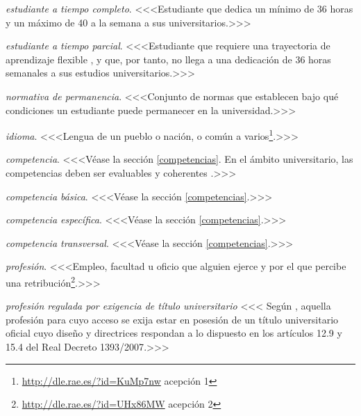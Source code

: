     \item \emph{estudiante a tiempo completo}. <<<Estudiante que dedica un mínimo
        de 36 horas y un máximo de 40 a la semana a sus
        universitarios\cite[artículo 4, apartado 4]{rdECTS}.>>>

    \item \emph{estudiante a tiempo parcial}. <<<Estudiante que requiere una
        trayectoria de aprendizaje flexible \cite[artículo 7, apartado 
        2]{estatutoEstudiante}, y que, por tanto, no llega a una dedicación de
        36 horas semanales a sus estudios universitarios.>>>

    \item \emph{normativa de permanencia}. <<<Conjunto de normas que establecen
        bajo qué condiciones un estudiante puede permanecer en la universidad.>>>

    \item \label{idioma} \emph{idioma}. <<<Lengua de un pueblo o nación, o común a
        varios\footnote{\url{http://dle.rae.es/?id=KuMp7nw} acepción 1}.>>>

    \item \emph{competencia}. <<<Véase la sección \ref{competencias}.
        En el ámbito universitario, las competencias deben ser
        evaluables y coherentes \cite[página 19]{guiaAneca}.>>>

    \item \emph{competencia básica}. <<<Véase la sección \ref{competencias}.>>>

    \item \emph{competencia específica}. <<<Véase la sección \ref{competencias}.>>>

    \item \emph{competencia transversal}. <<<Véase la sección \ref{competencias}.>>>

    \item \emph{profesión}. <<<Empleo, facultad u oficio que alguien ejerce y por
        el que percibe una
        retribución\footnote{\url{http://dle.rae.es/?id=UHx86MW} acepción 2}.>>>

    \item \emph{profesión regulada por exigencia de título universitario} <<< 
        Según \cite[artículo 4, apartado c]{rdECTS}, aquella profesión para cuyo
        acceso se exija estar en posesión de un título universitario oficial
        cuyo diseño y directrices respondan a lo dispuesto en los artículos
        12.9 y 15.4 del Real Decreto 1393/2007\cite{rd1393}.>>>

